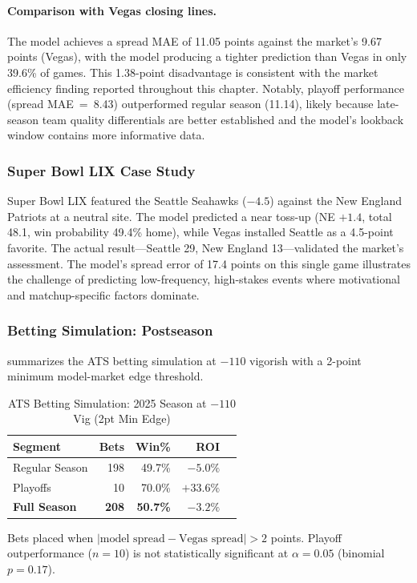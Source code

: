 \paragraph{Comparison with Vegas closing lines.}
The model achieves a spread MAE of 11.05 points against the market's 9.67 points (Vegas), with the model producing a tighter prediction than Vegas in only 39.6\% of games. This 1.38-point disadvantage is consistent with the market efficiency finding reported throughout this chapter. Notably, playoff performance (spread MAE~=~8.43) outperformed regular season (11.14), likely because late-season team quality differentials are better established and the model's lookback window contains more informative data.

\subsubsection{Super Bowl LIX Case Study}

Super Bowl LIX featured the Seattle Seahawks ($-4.5$) against the New England Patriots at a neutral site. The model predicted a near toss-up (NE $+1.4$, total 48.1, win probability 49.4\% home), while Vegas installed Seattle as a 4.5-point favorite. The actual result---Seattle 29, New England 13---validated the market's assessment. The model's spread error of 17.4 points on this single game illustrates the challenge of predicting low-frequency, high-stakes events where motivational and matchup-specific factors dominate.

\subsubsection{Betting Simulation: Postseason}

 summarizes the ATS betting simulation at $-110$ vigorish with a 2-point minimum model-market edge threshold.

\begin{table}[htbp]
\centering
\small
\caption{ATS Betting Simulation: 2025 Season at $-110$ Vig (2pt Min Edge)}
\label{tab:betting-sim-2025}
\begin{tabular}{@{}lrrrr@{}}
\toprule
\textbf{Segment} & \textbf{Bets} & \textbf{Win\%} & \textbf{ROI} \\
\midrule
Regular Season & 198 & 49.7\% & $-5.0\%$ \\
Playoffs & 10 & 70.0\% & $+33.6\%$ \\
\midrule
\textbf{Full Season} & \textbf{208} & \textbf{50.7\%} & $\mathbf{-3.2\%}$ \\
\bottomrule
\end{tabular}
\begin{tablenotes}
\item Bets placed when $|\text{model spread} - \text{Vegas spread}| > 2$ points. Playoff outperformance ($n=10$) is not statistically significant at $\alpha=0.05$ (binomial $p=0.17$).
\end{tablenotes}
\end{table}

